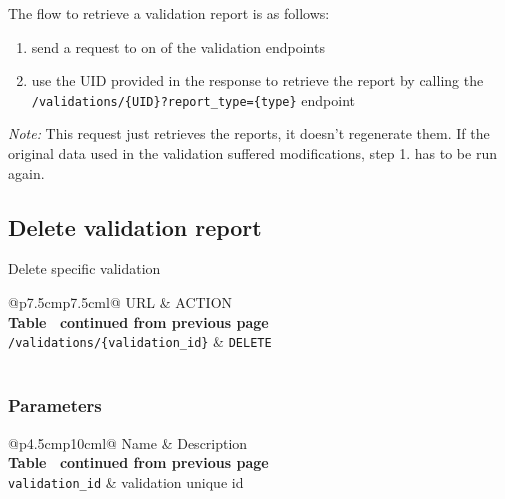 The flow to retrieve a validation report is as follows:
\begin{enumerate}
  \item send a request to on of the validation endpoints
  \item use the UID provided in the response to retrieve the report by calling the \texttt{/validations/\{UID\}?report\_type=\{type\}} endpoint
\end{enumerate}

\textit{Note:} This request just retrieves the reports, it doesn't regenerate them. 
If the original data used in the validation suffered modifications, step 1. has to be run again.

\subsection{Delete validation report}
Delete specific validation

\begin{longtable}[c]{@{}p{7.5cm}p{7.5cm}l@{}}
  \toprule
  URL                                      & ACTION           \\* \midrule
  \endfirsthead
  \multicolumn{3}{c}%
  {{\bfseries Table \thetable\ continued from previous page}} \\
  \endhead
  \bottomrule
  \endfoot
  \endlastfoot
  \texttt{/validations/\{validation\_id\}} & \texttt{DELETE}  \\* \bottomrule
  \label{tab:rdf-validator-delete-validation}                 \\
\end{longtable}

\subsubsection{Parameters}
\begin{longtable}[c]{@{}p{4.5cm}p{10cm}l@{}}
  \toprule
  Name                    & Description                       \\* \midrule
  \endfirsthead
  \multicolumn{3}{c}%
  {{\bfseries Table \thetable\ continued from previous page}} \\
  \endhead
  \bottomrule
  \endfoot
  \endlastfoot
  \texttt{validation\_id} & validation unique id              \\* \bottomrule
  \label{tab:rdf-validator-delete-validation-parameters}      \\
\end{longtable}

